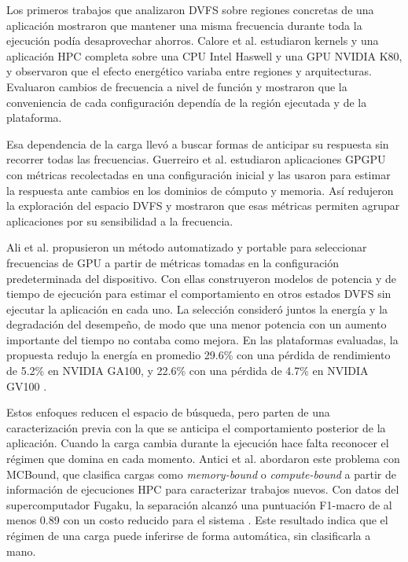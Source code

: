 Los primeros trabajos que analizaron DVFS sobre regiones concretas de una aplicación mostraron que mantener una misma frecuencia durante toda la ejecución podía desaprovechar ahorros. Calore et al. \cite{Calore2017} estudiaron kernels y una aplicación HPC completa sobre una CPU Intel Haswell y una GPU NVIDIA K80, y observaron que el efecto energético variaba entre regiones y arquitecturas. Evaluaron cambios de frecuencia a nivel de función y mostraron que la conveniencia de cada configuración dependía de la región ejecutada y de la plataforma.

Esa dependencia de la carga llevó a buscar formas de anticipar su respuesta sin recorrer todas las frecuencias. Guerreiro et al. \cite{Guerreiro2019} estudiaron aplicaciones GPGPU con métricas recolectadas en una configuración inicial y las usaron para estimar la respuesta ante cambios en los dominios de cómputo y memoria. Así redujeron la exploración del espacio DVFS y mostraron que esas métricas permiten agrupar aplicaciones por su sensibilidad a la frecuencia.

Ali et al. \cite{Ali2023} propusieron un método automatizado y portable para seleccionar frecuencias de GPU a partir de métricas tomadas en la configuración predeterminada del dispositivo. Con ellas construyeron modelos de potencia y de tiempo de ejecución para estimar el comportamiento en otros estados DVFS sin ejecutar la aplicación en cada uno. La selección consideró juntos la energía y la degradación del desempeño, de modo que una menor potencia con un aumento importante del tiempo no contaba como mejora. En las plataformas evaluadas, la propuesta redujo la energía en promedio 29.6\% con una pérdida de rendimiento de 5.2\% en NVIDIA GA100, y 22.6\% con una pérdida de 4.7\% en NVIDIA GV100 \cite{Ali2023}.

Estos enfoques reducen el espacio de búsqueda, pero parten de una caracterización previa con la que se anticipa el comportamiento posterior de la aplicación. Cuando la carga cambia durante la ejecución hace falta reconocer el régimen que domina en cada momento. Antici et al. \cite{Antici2024} abordaron este problema con MCBound, que clasifica cargas como \textit{memory-bound} o \textit{compute-bound} a partir de información de ejecuciones HPC para caracterizar trabajos nuevos. Con datos del supercomputador Fugaku, la separación alcanzó una puntuación F1-macro de al menos 0.89 con un costo reducido para el sistema \cite{Antici2024}. Este resultado indica que el régimen de una carga puede inferirse de forma automática, sin clasificarla a mano.


